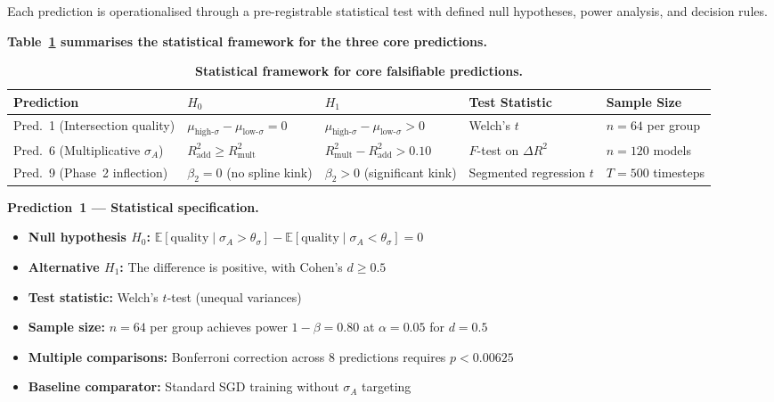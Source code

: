 \documentclass[10pt]{article}
\begin{document}
Each prediction is operationalised through a pre-registrable statistical
test with defined null hypotheses, power analysis, and decision rules.

\textbf{Table~\ref{tab:predictions-framework} summarises the statistical
framework for the three core predictions.}

\begin{table}[htbp]
\centering
\caption{\textbf{Statistical framework for core falsifiable predictions.}}
\label{tab:predictions-framework}
\small
\begin{tabular}{@{}l p{2.2cm} p{2.2cm} p{2.5cm} p{2.0cm}@{}}
\toprule
\textbf{Prediction} & \textbf{$H_0$} & \textbf{$H_1$} & \textbf{Test Statistic} & \textbf{Sample Size} \\
\midrule
Pred.~1 (Intersection quality) & $\mu_{\text{high-}\sigma} - \mu_{\text{low-}\sigma} = 0$ & $\mu_{\text{high-}\sigma} - \mu_{\text{low-}\sigma} > 0$ & Welch's $t$ & $n = 64$ per group \\
Pred.~6 (Multiplicative $\sigma_A$) & $R^2_{\text{add}} \geq R^2_{\text{mult}}$ & $R^2_{\text{mult}} - R^2_{\text{add}} > 0.10$ & $F$-test on $\Delta R^2$ & $n = 120$ models \\
Pred.~9 (Phase~2 inflection) & $\beta_2 = 0$ (no spline kink) & $\beta_2 > 0$ (significant kink) & Segmented regression $t$ & $T = 500$ timesteps \\
\bottomrule
\end{tabular}
\end{table}

\textbf{Prediction~1 --- Statistical specification.}
\begin{itemize}[nosep]
\item \textbf{Null hypothesis $H_0$:} $\mathbb{E}[\text{quality} \mid \sigma_A > \theta_\sigma] - \mathbb{E}[\text{quality} \mid \sigma_A < \theta_\sigma] = 0$
\item \textbf{Alternative $H_1$:} The difference is positive, with Cohen's $d \geq 0.5$
\item \textbf{Test statistic:} Welch's $t$-test (unequal variances)
\item \textbf{Sample size:} $n = 64$ per group achieves power $1 - \beta = 0.80$ at $\alpha = 0.05$ for $d = 0.5$
\item \textbf{Multiple comparisons:} Bonferroni correction across 8 predictions requires $p < 0.00625$
\item \textbf{Baseline comparator:} Standard SGD training without $\sigma_A$ targeting
\end{itemize}
\end{document}
